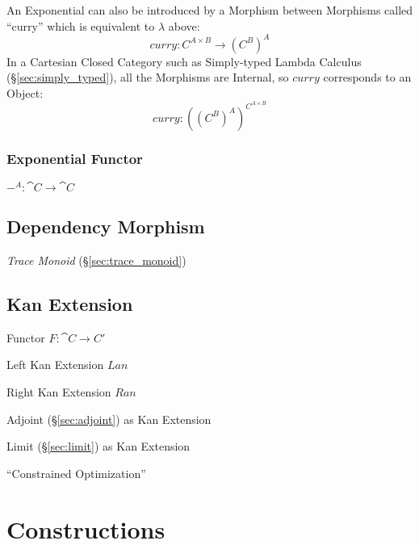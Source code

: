 An Exponential can also be introduced by a Morphism between Morphisms
called ``curry'' which is equivalent to $\lambda$ above:
\[
  curry : C^{A \times B} \rightarrow (C^B)^A
\]
In a Cartesian Closed Category such as Simply-typed Lambda Calculus
(\S\ref{sec:simply_typed}), all the Morphisms are Internal, so $curry$
corresponds to an Object:
\[
  curry : ((C^B)^A)^{C^{A \times B}}
\]



\subsubsection{Exponential Functor}\label{sec:exponential_functor}

$-^A : \cat{C} \rightarrow \cat{C}$



\subsection{Dependency Morphism}\label{sec:dependency_morphism}

\emph{Trace Monoid} (\S\ref{sec:trace_monoid})



\subsection{Kan Extension}\label{sec:kan_extension}

Functor $F : \cat{C} \rightarrow {C}'$

Left Kan Extension $Lan$

Right Kan Extension $Ran$

Adjoint (\S\ref{sec:adjoint}) as Kan Extension

Limit (\S\ref{sec:limit}) as Kan Extension

``Constrained Optimization'' %



\section{Constructions}\label{sec:category_construction}

